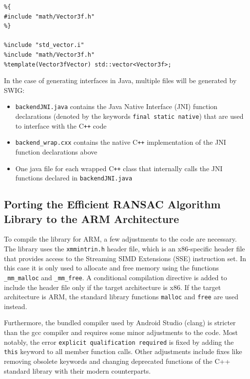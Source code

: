 \begin{lstlisting}[caption=Example SWIG interface file, label=lst:swig_interface]
%module backend
%{
#include "math/Vector3f.h"
%}

%include "std_vector.i"
%include "math/Vector3f.h"
%template(Vector3fVector) std::vector<Vector3f>;
\end{lstlisting}

In the case of generating interfaces in Java, multiple files will be generated by SWIG\@:
\begin{itemize}
    \item \texttt{backendJNI.java} contains the Java Native Interface (JNI) function declarations (denoted by the keywords \texttt{final static native}) that are used to interface with the C\texttt{++} code
    \item \texttt{backend\_wrap.cxx} contains the native C\texttt{++} implementation of the JNI function declarations above
    \item One java file for each wrapped C\texttt{++} class that internally calls the JNI functions declared in \texttt{backendJNI.java}
\end{itemize}

\subsection{Porting the Efficient RANSAC Algorithm Library to the ARM Architecture}
%
To compile the library for ARM, a few adjustments to the code are necessary.
The library uses the \texttt{xmmintrin.h} header file, which is an x86-specific header file
that provides access to the Streaming SIMD Extensions (SSE) instruction set. %
In this case it is only used to allocate and free memory using the functions \texttt{\_mm\_malloc} and \texttt{\_mm\_free}.
A conditional compilation directive is added to include the header file only if the target architecture is x86.
If the target architecture is ARM, the standard library functions \texttt{malloc} and \texttt{free} are used instead.

Furthermore, the bundled compiler used by Android Studio (clang)
is stricter than the gcc compiler and requires some minor adjustments to the code.
Most notably, the error \texttt{explicit qualification required} is fixed by adding the
\texttt{this} keyword to all member function calls.
Other adjustments include fixes like removing obsolete keywords and changing deprecated
functions of the C++ standard library with their modern counterparts.

